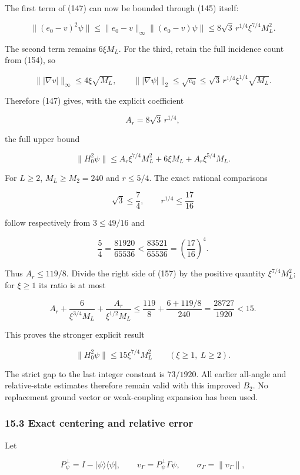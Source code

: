 \documentclass[
  11pt,
]{article}
\begin{document}
The first term of (147) can now be bounded through (145) itself:

\[
 \|(e_0-v)^2\psi\|
 \le\|e_0-v\|_\infty\|(e_0-v)\psi\|
 \le8\sqrt3\,r^{1/4}\xi^{7/4}M_L^2.
\]

The second term remains \(6\xi M_L\). For the third, retain the full
incidence count from (154), so

\[
 \||\nabla v|\|_\infty\le4\xi\sqrt{M_L},\qquad
 \||\nabla\psi|\|_2\le\sqrt{e_0}
 \le\sqrt3\,r^{1/4}\xi^{1/4}\sqrt{M_L}.
\]

Therefore (147) gives, with the explicit coefficient

\[
 A_r=8\sqrt3\,r^{1/4},
\]

the full upper bound

\[
 \boxed{\|H_0^2\psi\|
 \le A_r\xi^{7/4}M_L^2+6\xi M_L+A_r\xi^{5/4}M_L.}
\tag{157}
\]

For \(L\ge2\), \(M_L\ge M_2=240\) and \(r\le5/4\). The exact rational
comparisons

\[
 \sqrt3\le\frac74,\qquad
 r^{1/4}\le\frac{17}{16}
\]

follow respectively from \(3\le49/16\) and

\[
 \frac54=\frac{81920}{65536}
 <\frac{83521}{65536}=\left(\frac{17}{16}\right)^4.
\]

Thus \(A_r\le119/8\). Divide the right side of (157) by the positive
quantity \(\xi^{7/4}M_L^2\); for \(\xi\ge1\) its ratio is at most

\[
 A_r+\frac{6}{\xi^{3/4}M_L}
       +\frac{A_r}{\xi^{1/2}M_L}
 \le\frac{119}{8}+\frac{6+119/8}{240}
 =\frac{28727}{1920}<15.
\]

This proves the stronger explicit result

\[
 \boxed{\|H_0^2\psi\|\le15\xi^{7/4}M_L^2
 \qquad(\xi\ge1,\ L\ge2).}
\tag{158}
\]

The strict gap to the last integer constant is \(73/1920\). All earlier
all-angle and relative-state estimates therefore remain valid with this
improved \(B_2\). No replacement ground vector or weak-coupling
expansion has been used.

\subsubsection{15.3 Exact centering and relative
error}\label{exact-centering-and-relative-error}

Let

\[
 P_\psi^\perp=I-|\psi\rangle\langle\psi|,\qquad
 v_\Gamma=P_\psi^\perp\Gamma\psi,
 \qquad\sigma_\Gamma=\|v_\Gamma\|,
\]
\end{document}
